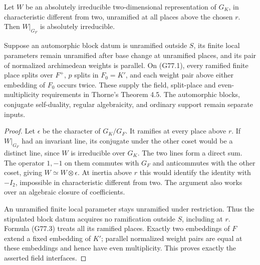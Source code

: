 \begin{corollary}
\label{cor:ACG77restriction}
Let \(W\) be an absolutely irreducible two-dimensional representation of \(G_K\), in characteristic different from two, unramified at all places above the chosen \(r\). Then \(W|_{G_F}\) is absolutely irreducible.

Suppose an automorphic block datum is unramified outside \(S\), its finite local parameters remain unramified after base change at unramified places, and its pair of normalized archimedean weights is parallel. On (G77.1), every ramified finite place splits over \(F^+\), \(p\) splits in \(F_0=K'\), and each weight pair above either embedding of \(F_0\) occurs twice. These supply the field, split-place and even-multiplicity requirements in Thorne's Theorem 4.5. The automorphic blocks, conjugate self-duality, regular algebraicity, and ordinary support remain separate inputs.
\end{corollary}

\begin{proof}
Let \(\epsilon\) be the character of \(G_K/G_F\). It ramifies at every place above \(r\). If \(W|_{G_F}\) had an invariant line, its conjugate under the other coset would be a distinct line, since \(W\) is irreducible over \(G_K\). The two lines form a direct sum. The operator \(1,-1\) on them commutes with \(G_F\) and anticommutes with the other coset, giving \(W\simeq W\otimes\epsilon\). At inertia above \(r\) this would identify the identity with \(-I_2\), impossible in characteristic different from two. The argument also works over an algebraic closure of coefficients.

An unramified finite local parameter stays unramified under restriction. Thus the stipulated block datum acquires no ramification outside \(S\), including at \(r\). Formula (G77.3) treats all its ramified places. Exactly two embeddings of \(F\) extend a fixed embedding of \(K'\); parallel normalized weight pairs are equal at these embeddings and hence have even multiplicity. This proves exactly the asserted field interfaces.
\end{proof}

